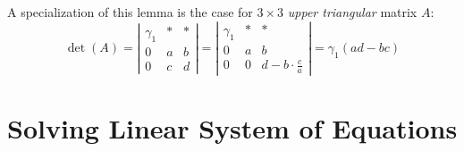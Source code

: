 \begin{corollary}
    A specialization of this lemma is the case for $3 \times 3$ \textit{upper triangular} matrix $A$:
    \begin{equation}
        \det(A) =
        \left\vert
        \begin{matrix}
            \gamma_1 & \ast & \ast \\
            0        & a    & b    \\
            0        & c    & d
        \end{matrix}        
        \right\vert
        =
        \left\vert
        \begin{matrix}
            \gamma_1 & \ast & \ast                    \\
            0        & a    & b                       \\
            0        & 0    & d - b \cdot \frac{c}{a}
        \end{matrix}        
        \right\vert
        =
        \gamma_1 (a d - b c)
    \end{equation}
\end{corollary}

\section{Solving Linear System of Equations}

